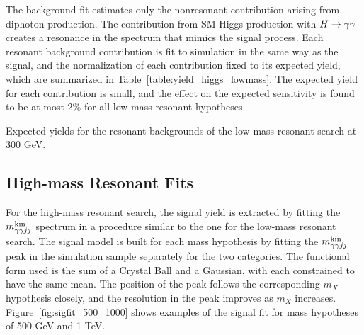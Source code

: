 The background fit estimates only the nonresonant contribution arising from diphoton
production. The contribution from SM Higgs production with $H\to\gamma\gamma$ creates a resonance in the
spectrum that mimics the signal process. Each resonant background
contribution is fit to simulation in the same way as the signal,
and the normalization of each contribution fixed to its expected yield, which are summarized
in Table~\ref{table:yield_higgs_lowmass}.
The expected yield for each contribution is small, and the
effect on the expected sensitivity is found to be at most 2\% for all low-mass resonant hypotheses.

\begin{table}[htbp!]
  \centering
  \renewcommand{\arraystretch}{1.4}
  \caption{Expected yields for the resonant backgrounds of the low-mass resonant search at 300 GeV.}
  
  \label{table:yield_higgs_lowmass}
\end{table}

\subsection{High-mass Resonant Fits}

For the high-mass resonant search, the signal yield is extracted by fitting the $m_{\gamma\gamma jj}^{\rm kin}$ spectrum
in a procedure similar to the one for the low-mass resonant search. The signal model is built
for each mass hypothesis by fitting the $m_{\gamma\gamma jj}^{\rm kin}$ peak in the simulation sample separately for the
two categories. The functional form used is the sum of a Crystal Ball and a Gaussian, with each
constrained to have the same mean. The position of the peak follows the corresponding $m_X$
hypothesis closely,
and the resolution in the peak improves as $m_X$ increases. Figure~\ref{fig:sigfit_500_1000}
shows examples of the signal fit for mass hypotheses of 500 GeV and 1 TeV.

